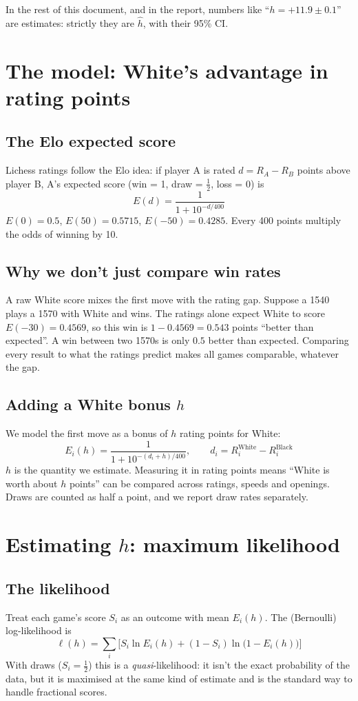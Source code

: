 \documentclass[11pt,a4paper]{article}
\begin{document}
In the rest of this document, and in the report, numbers like ``$h = +11.9 \pm 0.1$'' are
estimates: strictly they are $\hat h$, with their 95\% CI.

\section{The model: White's advantage in rating points}

\subsection{The Elo expected score}
Lichess ratings follow the Elo idea: if player A is rated $d = R_A - R_B$ points above player B,
A's expected score (win = 1, draw = $\frac12$, loss = 0) is
\[
E(d) = \frac{1}{1 + 10^{-d/400}}
\]
$E(0) = 0.5$, $E(50) = 0.5715$, $E(-50) = 0.4285$. Every 400 points multiply the odds of
winning by 10.

\subsection{Why we don't just compare win rates}
A raw White score mixes the first move with the rating gap. Suppose a 1540 plays a 1570 with
White and wins. The ratings alone expect White to score $E(-30) = 0.4569$, so this win is
$1 - 0.4569 = 0.543$ points ``better than expected''. A win between two 1570s is only $0.5$
better than expected. Comparing every result to what the ratings predict makes all games
comparable, whatever the gap.

\subsection{Adding a White bonus $h$}
We model the first move as a bonus of $h$ rating points for White:
\[
E_i(h) = \frac{1}{1 + 10^{-(d_i + h)/400}}, \qquad d_i = R^{\text{White}}_i - R^{\text{Black}}_i
\]
$h$ is the quantity we estimate. Measuring it in rating points means ``White is worth about
$h$ points'' can be compared across ratings, speeds and openings. Draws are counted as half a
point, and we report draw rates separately.

\section{Estimating $h$: maximum likelihood}\label{sec:mle}

\subsection{The likelihood}
Treat each game's score $S_i$ as an outcome with mean $E_i(h)$. The (Bernoulli) log-likelihood is
\[
\ell(h) = \sum_i \Big[ S_i \ln E_i(h) + (1 - S_i) \ln\big(1 - E_i(h)\big) \Big]
\]
With draws ($S_i = \frac12$) this is a \emph{quasi}-likelihood: it isn't the exact probability
of the data, but it is maximised at the same kind of estimate and is the standard way to handle
fractional scores.
\end{document}
